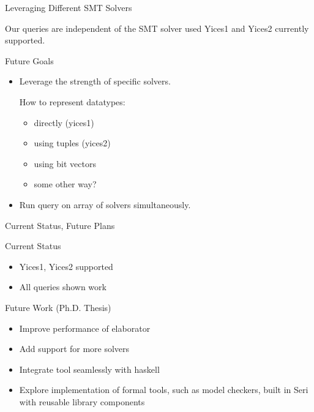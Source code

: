 \documentclass{beamer}
\begin{document}
\begin{frame}{Leveraging Different SMT Solvers}
\begin{block}{Our queries are independent of the SMT solver used}
Yices1 and Yices2 currently supported.
\end{block}
\pause
\begin{block}{Future Goals}
    \begin{itemize}
        \item Leverage the strength of specific solvers.
        \begin{example}{How to represent datatypes:}
        \begin{itemize}
            \item directly (yices1)
            \item using tuples (yices2)
            \item using bit vectors
            \item some other way?
        \end{itemize}
        \end{example}

        \item Run query on array of solvers simultaneously.
    \end{itemize}
\end{block}
\end{frame}

\begin{frame}{Current Status, Future Plans}
\begin{block}{Current Status}
    \begin{itemize}
        \item Yices1, Yices2 supported
        \item All queries shown work
    \end{itemize}
\end{block}
\pause
\begin{block}{Future Work (Ph.D. Thesis)}
    \begin{itemize}
        \item Improve performance of elaborator
        \item Add support for more solvers
        \item Integrate tool seamlessly with haskell
        \item Explore implementation of formal tools, such as model checkers,
              built in Seri with reusable library components
    \end{itemize}
\end{block}
\end{frame}
\end{document}
